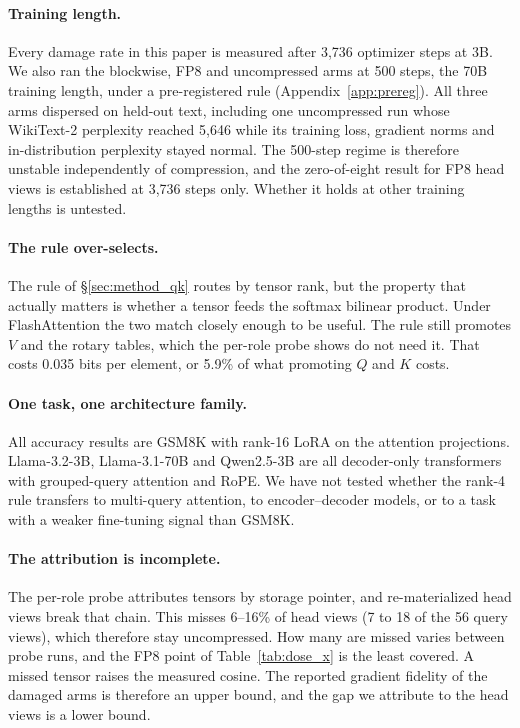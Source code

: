\documentclass[11pt,letterpaper]{article}
\begin{document}
\paragraph{Training length.} Every damage rate in this paper is measured after 3{,}736 optimizer steps at 3B. We also ran the blockwise, FP8 and uncompressed arms at 500 steps, the 70B training length, under a pre-registered rule (Appendix~\ref{app:prereg}). All three arms dispersed on held-out text, including one uncompressed run whose WikiText-2 perplexity reached 5{,}646 while its training loss, gradient norms and in-distribution perplexity stayed normal. The 500-step regime is therefore unstable independently of compression, and the zero-of-eight result for FP8 head views is established at 3{,}736 steps only. Whether it holds at other training lengths is untested.

\paragraph{The rule over-selects.} The rule of \S\ref{sec:method_qk} routes by tensor rank, but the property that actually matters is whether a tensor feeds the softmax bilinear product. Under FlashAttention the two match closely enough to be useful. The rule still promotes $V$ and the rotary tables, which the per-role probe shows do not need it. That costs 0.035 bits per element, or 5.9\% of what promoting $Q$ and $K$ costs.

\paragraph{One task, one architecture family.} All accuracy results are GSM8K with rank-16 LoRA on the attention projections. Llama-3.2-3B, Llama-3.1-70B and Qwen2.5-3B are all decoder-only transformers with grouped-query attention and RoPE. We have not tested whether the rank-4 rule transfers to multi-query attention, to encoder--decoder models, or to a task with a weaker fine-tuning signal than GSM8K.

\paragraph{The attribution is incomplete.} The per-role probe attributes tensors by storage pointer, and re-materialized head views break that chain. This misses 6--16\% of head views (7 to 18 of the 56 query views), which therefore stay uncompressed. How many are missed varies between probe runs, and the FP8 point of Table~\ref{tab:dose_x} is the least covered. A missed tensor raises the measured cosine. The reported gradient fidelity of the damaged arms is therefore an upper bound, and the gap we attribute to the head views is a lower bound.
\end{document}
